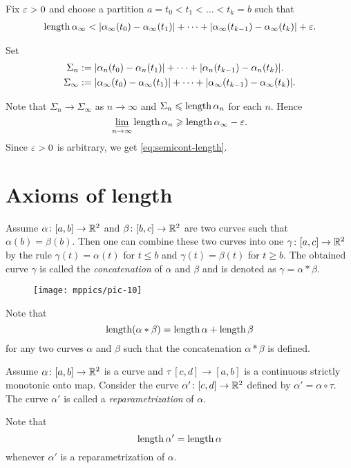 Fix $\varepsilon > 0$ and choose a partition $a=t_0<t_1<\dots<t_k=b$
such that 
\begin{align*}
\mathop{\rm length}\nolimits\alpha_\infty<
|\alpha_\infty(t_0)-\alpha_\infty(t_1)|+\dots+|\alpha_\infty(t_{k-1})-\alpha_\infty(t_k)|+\varepsilon.
\end{align*}

Set 
\begin{align*}\Sigma_n
&:=
|\alpha_n(t_0)-\alpha_n(t_1)|+\dots+|\alpha_n(t_{k-1})-\alpha_n(t_k)|.
\\
\Sigma_\infty
&:=
|\alpha_\infty(t_0)-\alpha_\infty(t_1)|+\dots+|\alpha_\infty(t_{k-1})-\alpha_\infty(t_k)|.
\end{align*}

Note that $\Sigma_n\to \Sigma_\infty$ as $n\to\infty$
and $\Sigma_n\leqslant\mathop{\rm length}\nolimits\alpha_n$ for each $n$.
Hence
$$\varliminf_{n\to\infty} \mathop{\rm length}\nolimits\alpha_n \geqslant \mathop{\rm length}\nolimits\alpha_\infty-\varepsilon.$$
Since $\varepsilon>0$ is arbitrary, we get \ref{eq:semicont-length}.\qeds

\section{Axioms of length}

Assume $\alpha\colon[a,b]\to \mathbb{R}^2$ and $\beta\:[b,c]\z\to \RR^2$ are two curves such that $\alpha(b)=\beta(b)$.
Then one can combine these two curves into one $\gamma\:[a,c]\z\to \RR^2$ by the rule $\gamma(t)=\alpha(t)$ for $t\le b$ and $\gamma(t) = \beta(t)$ for $t\ge b$.
The obtained curve $\gamma$ is called the 
\emph{concatenation} of $\alpha$ and $\beta$ and is denoted as $\gamma=\alpha*\beta$.

\begin{wrapfigure}{r}{30 mm}
\vskip-0mm
\centering
\texttt{[image: mppics/pic-10]}
\end{wrapfigure}

Note that
\[\mathop{\rm length}\nolimits(\alpha*\beta)=\mathop{\rm length}\nolimits\alpha+\mathop{\rm length}\nolimits\beta\]
for any two curves $\alpha$ and $\beta$ such that the concatenation $\alpha*\beta$ is defined.

Assume $\alpha\colon[a,b]\to \mathbb{R}^2$ is a curve and $\tau\:[c,d]\to [a,b]$ is a continuous strictly monotonic onto map.
Consider the curve $\alpha'\colon[c,d]\to \mathbb{R}^2$ defined by $\alpha'=\alpha\circ\tau$.
The curve $\alpha'$ is called a \emph{reparametrization} of $\alpha$.

Note that 
\[\mathop{\rm length}\nolimits\alpha'=\mathop{\rm length}\nolimits\alpha\]
whenever $\alpha'$ is a reparametrization of $\alpha$.





